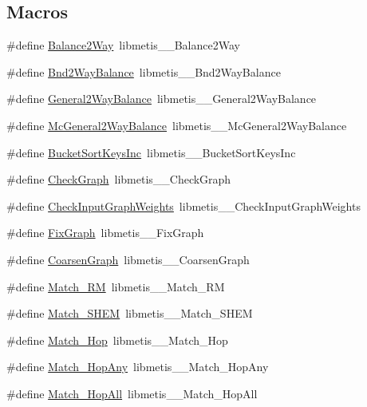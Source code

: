 \subsection*{Macros}
\begin{DoxyCompactItemize}
\item 
\#define \hyperlink{a00957_ad98cbfbee3ef7782e52f4173bb3c6b0a}{Balance2\+Way}~libmetis\+\_\+\+\_\+\+Balance2\+Way
\item 
\#define \hyperlink{a00957_a9f26cd3439fcd06c54da0755c4b3cb3a}{Bnd2\+Way\+Balance}~libmetis\+\_\+\+\_\+\+Bnd2\+Way\+Balance
\item 
\#define \hyperlink{a00957_a433eb4388532304cbe935a380aeca0c8}{General2\+Way\+Balance}~libmetis\+\_\+\+\_\+\+General2\+Way\+Balance
\item 
\#define \hyperlink{a00957_a7b205d9db4a064049d4c2ab8e34717a7}{Mc\+General2\+Way\+Balance}~libmetis\+\_\+\+\_\+\+Mc\+General2\+Way\+Balance
\item 
\#define \hyperlink{a00957_ab41c13900da1f8dd011b2d85f4c556c3}{Bucket\+Sort\+Keys\+Inc}~libmetis\+\_\+\+\_\+\+Bucket\+Sort\+Keys\+Inc
\item 
\#define \hyperlink{a00957_ab15719ce95cc7851b64192d40f684ea3}{Check\+Graph}~libmetis\+\_\+\+\_\+\+Check\+Graph
\item 
\#define \hyperlink{a00957_a61087f9578f10f0b56a079440be72d72}{Check\+Input\+Graph\+Weights}~libmetis\+\_\+\+\_\+\+Check\+Input\+Graph\+Weights
\item 
\#define \hyperlink{a00957_a9c7394fbe27487b496f72afdb8847485}{Fix\+Graph}~libmetis\+\_\+\+\_\+\+Fix\+Graph
\item 
\#define \hyperlink{a00957_a88ceb8a0fa2174265ee271d8f8400fc9}{Coarsen\+Graph}~libmetis\+\_\+\+\_\+\+Coarsen\+Graph
\item 
\#define \hyperlink{a00957_a3c875fc381748011ade43ee7aea7c51f}{Match\+\_\+\+RM}~libmetis\+\_\+\+\_\+\+Match\+\_\+\+RM
\item 
\#define \hyperlink{a00957_a30e376682d908f369909db077c179422}{Match\+\_\+\+S\+H\+EM}~libmetis\+\_\+\+\_\+\+Match\+\_\+\+S\+H\+EM
\item 
\#define \hyperlink{a00957_af04720b37e24ca1f08553a4c92faba81}{Match\+\_\+Hop}~libmetis\+\_\+\+\_\+\+Match\+\_\+Hop
\item 
\#define \hyperlink{a00957_abbea929246692b7d49a48e1f4156d78d}{Match\+\_\+Hop\+Any}~libmetis\+\_\+\+\_\+\+Match\+\_\+Hop\+Any
\item 
\#define \hyperlink{a00957_a687488153e2631a7b3d68ac5a1216eeb}{Match\+\_\+Hop\+All}~libmetis\+\_\+\+\_\+\+Match\+\_\+Hop\+All

\end{DoxyCompactItemize}

